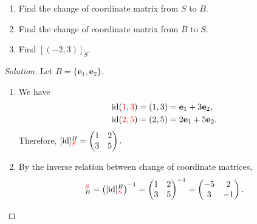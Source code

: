 \documentclass[12pt]{article}
\newenvironment{solution}
{\begin{proof}[Solution]}
{\end{proof}}
\begin{document}
\begin{enumerate}
    \item[(a)] Find the change of coordinate matrix from $S$ to $B$.
    
    \item[(b)] Find the change of coordinate matrix from $B$ to $S$.
    
    \item[(c)] Find $[(-2,3)]_S$.
\end{enumerate}

\newpage

\begin{solution}
Let $B=\{\mathbf{e}_1,\mathbf{e}_2\}$.

\begin{enumerate}
    \item[(a)] We have
    \begin{align*}
        \operatorname{id}(\textcolor{red}{1,3})
        &= (1,3)
         = \mathbf{e}_1+3\mathbf{e}_2,\\
        \operatorname{id}(\textcolor{red}{2,5})
        &= (2,5)
         = 2\mathbf{e}_1+5\mathbf{e}_2.
    \end{align*}
    Therefore,
    $[\operatorname{id}]_{\textcolor{red}{S}}^B=
    \begin{pmatrix}
        1 & 2\\
        3 & 5
    \end{pmatrix}.$

    \item[(b)] By the inverse relation between change of coordinate matrices,
    \begin{align*}
        [\operatorname{id}]_B^{\textcolor{red}{S}}
        =
        \left([\operatorname{id}]_{\textcolor{red}{S}}^B\right)^{-1}
        =
        \begin{pmatrix}
            1 & 2\\
            3 & 5
        \end{pmatrix}^{-1}
        =
        \begin{pmatrix}
            -5 & 2\\
            3 & -1
        \end{pmatrix}.
    \end{align*}


\end{enumerate}
\end{solution}
\end{document}
